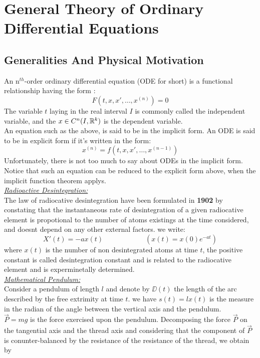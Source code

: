 \chapter{General Theory of Ordinary Differential Equations}
\section{Generalities And Physical Motivation}

An n$^{th} $-order ordinary differential equation (ODE for short) 
is a functional relationship having the form :
\[
F(t, x, x', \hdots , x^{(n)})  = 0
\]
The variable $t $ laying in the real interval $ I $ is commonly called the 
independent variable, and the $x \in C^{n}(I, \mathbb{R} ^{k} )$ is the dependent 
variable. \\
An equation such as the above, is 
said to be in the implicit form. An ODE
is said to be in explicit form if 
it's written in the form: 
\[
x^{(n) } = 
f(t, x, x', \hdots , x^{(n-1) }) 
\]
Unfortunately, there is not too much to say about 
ODEs in the implicit form. Notice that such an equation 
can be reduced to the explicit form above, when the implicit function 
theorem applys.\\
\underline{\emph{Radioactive Desintegration:}} \\ The law of radiocative desintegration
have been formulated in \textbf{1902} by constating that the instantaneous 
rate of desintegration of a given radiocative element is propotional to the
number of atoms existings at the time considered, and doesnt 
depend on any other external factors. we write: 
\[
  X'(t)  = - a x(t)  \quad \quad \quad \quad \quad \quad 
  ( x(t) = x(0) e^{-at}   ) 
\]
where $x(t)$ is the number of non desintegrated atoms at time $t$, 
the positive constant is called desintegration constant and is related to the 
radiocative element and is experminetally determined.\\
\underline{\emph{Mathematical Pendulum:}} \\ Consider a pendulum of length $l $ and denote by $\DD  (t)  $ the length of the 
arc described by the free extrimity at time $t$. we have $s(t) = l x(t)   $ is
the measure in the radian of the angle between the vertical axis and the pendulum. \\
$\vec{P} = mg  $  is the force exercised upon the pendulum. Decomposing the force $\vec{P}  $ 
on the tangential axis and the thread axis and considering that the component of $\vec{P}  $ is
conunter-balanced by the resistance of the resistance of the thread, we obtain by
